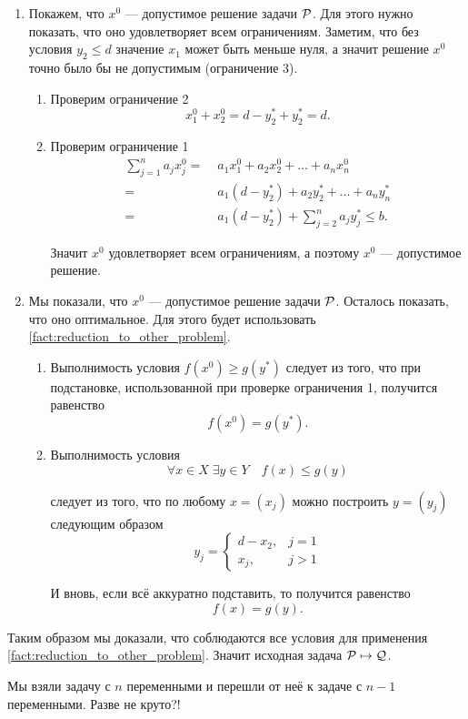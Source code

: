 \begin{enumerate}[nosep]
	\item Покажем, что $x^0$ --- допустимое решение задачи $\P$. Для этого нужно показать, что оно удовлетворяет всем ограничениям. Заметим, что без условия $y_2 \le d$ значение $x_1$ может быть меньше нуля, а значит решение $x^0$ точно было бы не допустимым (ограничение 3).
	
	\begin{enumerate}
		\item Проверим ограничение 2
			\[
				x^0_1 + x^0_2 = d - y^*_2 + y^*_2 = d.
			\]
			
		\item Проверим ограничение 1
			\begin{align*}
				\sum_{j=1}^{n} a_j x^0_j =& \; a_1 x^0_1 + a_2 x^0_2 + \dots + a_n x^0_n \\
				=& \; a_1 (d - y^*_2) + a_2 y^*_2 + \dots + a_n y^*_n \\
				=& \; a_1 (d-y^*_2) + \sum_{j=2}^{n}a_j y^*_j \le b.
			\end{align*}
		
			Значит $x^0$ удовлетворяет всем ограничениям, а поэтому $x^0$ --- допустимое решение.	
	\end{enumerate}
	
	\item Мы показали, что $x^0$ --- допустимое решение задачи $\P$. Осталось показать, что оно оптимальное. Для этого будет использовать \ref{fact:reduction_to_other_problem}.
		
		\begin{enumerate}
			\item Выполнимость условия $f(x^0) \ge g(y^*)$ следует из того, что при подстановке, использованной при проверке ограничения 1, получится равенство
			\[
				f(x^0) = g(y^*).
			\]
			
			\item Выполнимость условия
			\[
				\forall x \in X \; \exists y \in Y \quad f(x) \le g(y)
			\]
			
			следует из того, что по любому $x = (x_j)$ можно построить $y = (y_j)$ следующим образом
			\[
				y_j = \begin{cases}
					d - x_2,& j = 1 \\
					x_j,& j > 1
				\end{cases}
			\]
		
			И вновь, если всё аккуратно подставить, то получится равенство
			\[
				f(x) = g(y).
			\]
		\end{enumerate}
\end{enumerate}

Таким образом мы доказали, что соблюдаются все условия для применения \cref{fact:reduction_to_other_problem}. Значит исходная задача $\P \mapsto \Q$.

Мы взяли задачу с $n$ переменными и перешли от неё к задаче с $n-1$ переменными. Разве не круто?!
